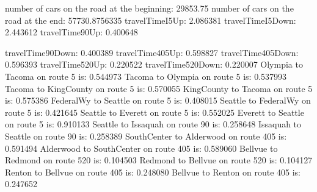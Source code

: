 number of cars on the road at the beginning:
29853.75
number of cars on the road at the end:
57730.8756335
travelTimeI5Up: 2.086381
travelTimeI5Down: 2.443612
travelTime90Up: 0.400648

travelTime90Down: 0.400389
travelTime405Up: 0.598827
travelTime405Down: 0.596393
travelTime520Up: 0.220522
travelTime520Down: 0.220007
Olympia to Tacoma on route 5 is: 0.544973
Tacoma to Olympia on route 5 is: 0.537993
Tacoma to KingCounty on route 5 is: 0.570055
KingCounty to Tacoma on route 5 is: 0.575386
FederalWy to Seattle on route 5 is: 0.408015
Seattle to FederalWy on route 5 is: 0.421645
Seattle to Everett on route 5 is: 0.552025
Everett to Seattle on route 5 is: 0.910133
Seattle to Issaquah on route 90 is: 0.258648
Issaquah to Seattle on route 90 is: 0.258389
SouthCenter to Alderwood on route 405 is: 0.591494
Alderwood to SouthCenter on route 405 is: 0.589060
Bellvue to Redmond on route 520 is: 0.104503
Redmond to Bellvue on route 520 is: 0.104127
Renton to Bellvue on route 405 is: 0.248080
Bellvue to Renton on route 405 is: 0.247652